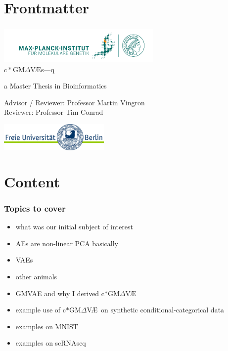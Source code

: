 \documentclass[final]{beamer}
\title{\scgmvae}{}
\author{Kolb, Yiftach}
\newcommand{\gmvae}{c$\ast$GM$\Delta$V\AE~}
\newcommand{\scgmvae}{$\mathrm{c}{\ast}\mathrm{GM}\Delta$V{\AE}s---q}
\begin{document}
\maketitle

\section{Frontmatter}

\begin{frame}
\frametitle{}
\begin{center}
{\includegraphics[width=0.60\textwidth]{images/MPIMG_RGB_gruen.png}}\\
\vspace*{1cm}
\large
\scgmvae

\normalsize
a Master Thesis in Bioinformatics
\vspace{0.2cm}

Advisor / Reviewer: Professor Martin Vingron\\
Reviewer: Professor Tim Conrad

\vfill



\vfill
{\includegraphics[width=0.4\textwidth]{images/fu-logo_bildschirm_RGB1.jpg}}
\end{center}
\normalsize
\end{frame}

\section{Content}

\begin{frame}
\frametitle{Topics to cover}
\begin{itemize}
\item{} what was our initial subject of interest
\item{} AEs are non-linear PCA basically
\item{} VAEs
\item{} other animals
\item{} GMVAE and why I derived \gmvae
\item{} example use of \gmvae on synthetic conditional-categorical data
\item{} examples on MNIST
\item{} examples on scRNAseq
\end{itemize}
\end{frame}
\end{document}
